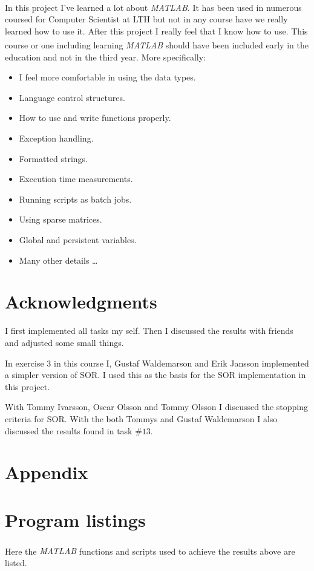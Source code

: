 \documentclass[10pt, a4paper]{article}
\newcommand{\matlab}{\small{\emph{MATLAB\textsuperscript{\textregistered}}}}
\begin{document}
In this project I've learned a lot about \matlab{}. It has been used in numerous coursed for Computer Scientist at LTH but not in any course have we really learned how to use it. After this project I really feel that I know how to use. This course or one including learning \matlab{} should have been included early in the education and not in the third year. More specifically:

\begin{itemize}
	\item I feel more comfortable in using the data types.
	\item Language control structures.
	\item How to use and write functions properly.
	\item Exception handling.
	\item Formatted strings.
	\item Execution time measurements.
	\item Running scripts as batch jobs.
	\item Using sparse matrices.
	\item Global and persistent variables.
	\item Many other details \ldots
\end{itemize}


\section{Acknowledgments}
I first implemented all tasks my self. Then I discussed the results with friends and adjusted some small things.

In exercise $3$ in this course I, Gustaf Waldemarson and Erik Jansson implemented a simpler version of SOR. I used this as the basis for the SOR implementation in this project.

With Tommy Ivarsson, Oscar Olsson and Tommy Olsson I discussed the stopping criteria for SOR. With the both Tommys and Gustaf Waldemarson I also discussed the results found in task $\#13$.

{}


\newpage
\section*{Appendix}
\appendix
\section{Program listings} \label{appendix+programs}
Here the \matlab{} functions and scripts used to achieve the results above are listed.
\end{document}
